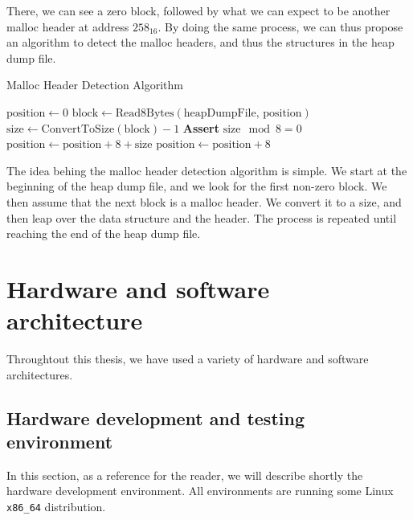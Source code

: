     There, we can see a zero block, followed by what we can expect to be another malloc header at address $ 258_{16} $. By doing the same process, we can thus propose an algorithm to detect the malloc headers, and thus the structures in the heap dump file.

    \begin{algorithm}[H]
        \caption{Malloc Header Detection Algorithm}
        \begin{algorithmic}[1]
            \State $\text{position} \gets 0$
                \State $\text{block} \gets \text{Read8Bytes}(\text{heapDumpFile, position})$
                    \State $\text{size} \gets \text{ConvertToSize}(\text{block}) - 1$ 
                    \State \textbf{Assert} $ \text{size} \mod 8 = 0$ 
                    \State $\text{position} \gets \text{position} + 8 + \text{size}$ 
                \Else
                    \State $\text{position} \gets \text{position} + 8$
                \EndIf
            \EndWhile
        \EndProcedure
        \end{algorithmic}
    \end{algorithm}

    The idea behing the malloc header detection algorithm is simple. We start at the beginning of the heap dump file, and we look for the first non-zero block. We then assume that the next block is a malloc header. We convert it to a size, and then leap over the data structure and the header. The process is repeated until reaching the end of the heap dump file.

    \section{Hardware and software architecture}
    Throughtout this thesis, we have used a variety of hardware and software architectures. 
    
    \subsection{Hardware development and testing environment}
    In this section, as a reference for the reader, we will describe shortly the hardware development environment. All environments are running some Linux \texttt{x86\_64} distribution.

